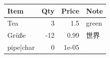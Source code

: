 \begin{tabular}{lrrl}
\toprule
 Item      &   Qty &   Price & Note   \\
\midrule
 Tea       &     3 &   1.5   & green  \\
 Grüße     &   -12 &   0.99  & 世界     \\
 pipe|char &     0 &   1e-05 &        \\
\bottomrule
\end{tabular}
